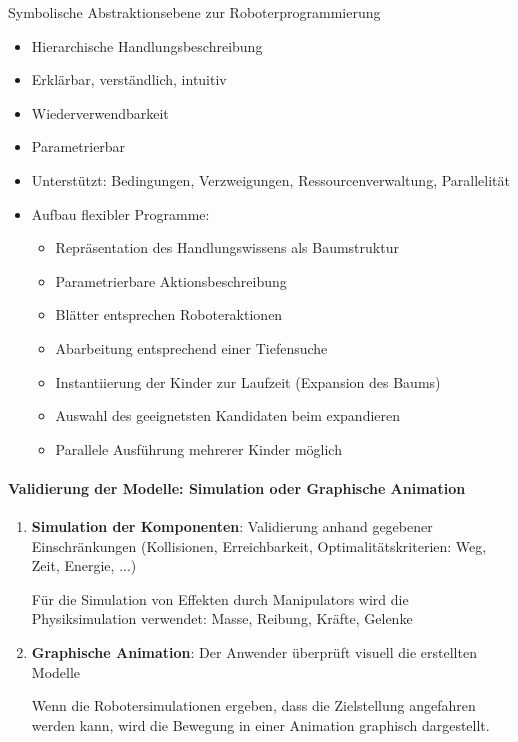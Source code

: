 Symbolische Abstraktionsebene zur Roboterprogrammierung
\begin{itemize}
\item Hierarchische Handlungsbeschreibung
\item Erklärbar, verständlich, intuitiv
\item Wiederverwendbarkeit
\item Parametrierbar
\item Unterstützt: Bedingungen, Verzweigungen, Ressourcenverwaltung, Parallelität
\item Aufbau flexibler Programme:
\begin{itemize}
\item Repräsentation des Handlungswissens als Baumstruktur
\item Parametrierbare Aktionsbeschreibung
\item Blätter entsprechen Roboteraktionen
\item Abarbeitung entsprechend einer Tiefensuche
\item Instantiierung der Kinder zur Laufzeit (Expansion des Baums)
\item Auswahl des geeignetsten Kandidaten beim expandieren
\item Parallele Ausführung mehrerer Kinder möglich
\end{itemize}
\end{itemize}
\paragraph*{Validierung der Modelle: Simulation oder Graphische Animation}
\begin{enumerate}
\item \textbf{Simulation der Komponenten}: Validierung anhand gegebener Einschränkungen (Kollisionen, Erreichbarkeit, Optimalitätskriterien: Weg, Zeit, Energie, ...)
\begin{itemize}
\ita Für die Simulation von Effekten durch Manipulators wird die Physiksimulation verwendet: Masse, Reibung, Kräfte, Gelenke
\end{itemize}
\item \textbf{Graphische Animation}: Der Anwender überprüft visuell die erstellten Modelle
\begin{itemize}
\ita Wenn die Robotersimulationen ergeben, dass die Zielstellung angefahren werden kann, wird die Bewegung in einer Animation graphisch dargestellt.
\end{itemize}
\end{enumerate}

